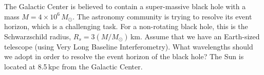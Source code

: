 The Galactic Center is believed to contain a super-massive black hole with a
mass $M = 4 \times 10^6\,M_\odot$. The astronomy community is trying to resolve
its event horizon, which is a challenging task. For a non-rotating black hole,
this is the Schwarzschild radius, $R_s = 3(M/M_\odot)$\,km. Assume that we have
an Earth-sized telescope (using Very Long Baseline Interferometry). What
wavelengths should we adopt in order to resolve the event horizon of the black
hole? The Sun is located at 8.5\,kpc from the Galactic Center.
